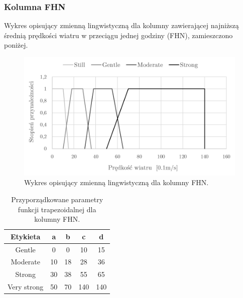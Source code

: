 \documentclass{classrep}
\begin{document}
\subsubsection{Kolumna FHN}
Wykres opisujący zmienną lingwistyczną dla kolumny zawierającej najniższą średnią prędkości wiatru w przeciągu jednej godziny (FHN), zamieszczono poniżej.
\begin{figure}[H]
	\centering
	\includegraphics[width=0.99\textwidth]{Pictures/TermsCharts/FHN.png}
	\caption{Wykres opisujący zmienną lingwistyczną dla kolumny FHN.}
\end{figure}

\begin{table}[H]
	\centering
	\begin{tabular}{c c c c c} 
		\hline
		\textbf{Etykieta} & \textbf{a} & \textbf{b} & \textbf{c} & \textbf{d}\\ [0.5ex] 
		\hline
		\hline 
Gentle	 & 0 & 0 & 10 & 15 \\
Moderate & 10 & 18 & 28 & 36 \\
Strong	 & 30 & 38 & 55 & 65 \\
Very strong & 50 & 70 & 140 & 140 \\
		\hline
	\end{tabular}
	\caption{Przyporządkowane parametry funkcji trapezoidalnej dla kolumny FHN.}
\end{table}

\clearpage
\end{document}
